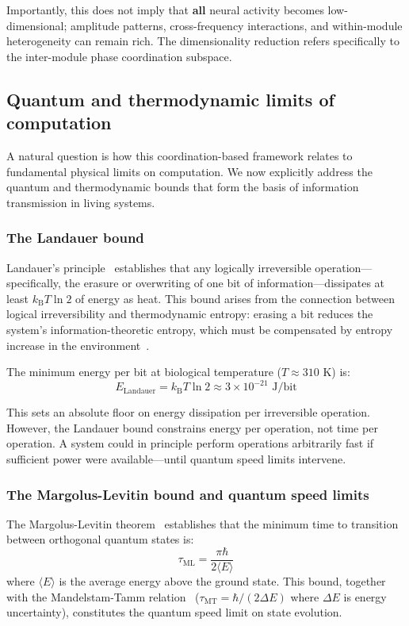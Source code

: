 \documentclass[12pt]{article}
\newcommand{\kB}{k_{\mathrm{B}}}
\begin{document}
Importantly, this does not imply that \textbf{all} neural activity becomes low-dimensional; amplitude patterns, cross-frequency interactions, and within-module heterogeneity can remain rich. The dimensionality reduction refers specifically to the inter-module phase coordination subspace.

\subsection{Quantum and thermodynamic limits of computation}

A natural question is how this coordination-based framework relates to fundamental physical limits on computation. We now explicitly address the quantum and thermodynamic bounds that form the basis of information transmission in living systems.

\subsubsection{The Landauer bound}

Landauer's principle~\cite{landauer1961} establishes that any logically irreversible operation---specifically, the erasure or overwriting of one bit of information---dissipates at least $\kB T \ln 2$ of energy as heat. This bound arises from the connection between logical irreversibility and thermodynamic entropy: erasing a bit reduces the system's information-theoretic entropy, which must be compensated by entropy increase in the environment~\cite{bormashenko2024}.

The minimum energy per bit at biological temperature ($T \approx 310$ K) is:
\[
E_{\mathrm{Landauer}} = \kB T \ln 2 \approx 3 \times 10^{-21} \text{ J/bit}
\]

This sets an absolute floor on energy dissipation per irreversible operation. However, the Landauer bound constrains energy per operation, not time per operation. A system could in principle perform operations arbitrarily fast if sufficient power were available---until quantum speed limits intervene.

\subsubsection{The Margolus-Levitin bound and quantum speed limits}

The Margolus-Levitin theorem~\cite{margolus1998} establishes that the minimum time to transition between orthogonal quantum states is:
\[
\tau_{\mathrm{ML}} = \frac{\pi\hbar}{2\langle E \rangle}
\]
where $\langle E \rangle$ is the average energy above the ground state. This bound, together with the Mandelstam-Tamm relation~\cite{mandelstam1945} ($\tau_{\mathrm{MT}} = \hbar/(2\Delta E)$ where $\Delta E$ is energy uncertainty), constitutes the quantum speed limit on state evolution.
\end{document}
